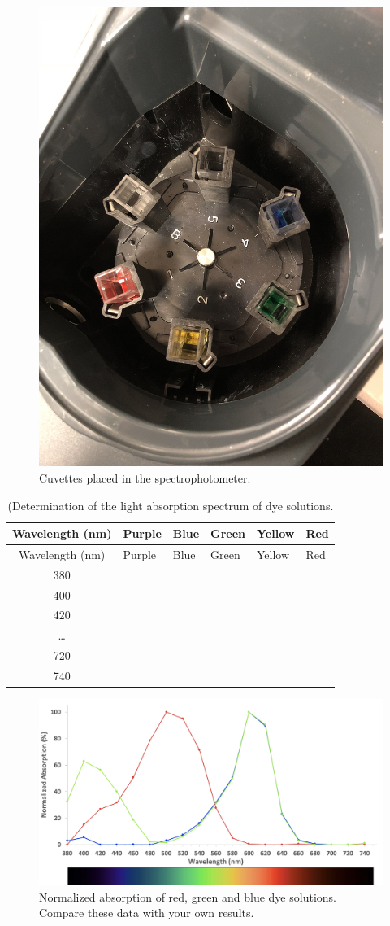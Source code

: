 \begin{figure}

{\centering \includegraphics[width=0.7\linewidth]{./figures/photosynthesis/cuvettes}

}

\caption{Cuvettes placed in the spectrophotometer.}\label{fig:cuvettes}
\end{figure}

\begin{longtable}[]{@{}clllll@{}}
\caption{(\label{tab:absorption} Determination of the light absorption
spectrum of dye solutions.}\tabularnewline
\toprule
Wavelength (nm) & Purple & Blue & Green & Yellow & Red\tabularnewline
\midrule
\endfirsthead
\toprule
Wavelength (nm) & Purple & Blue & Green & Yellow & Red\tabularnewline
\midrule
\endhead
380 & & & & &\tabularnewline
400 & & & & &\tabularnewline
420 & & & & &\tabularnewline
\ldots{} & & & & &\tabularnewline
720 & & & & &\tabularnewline
740 & & & & &\tabularnewline
\bottomrule
\end{longtable}

\begin{figure}

{\centering \includegraphics[width=0.7\linewidth]{./figures/photosynthesis/absorption_result}

}

\caption{Normalized absorption of red, green and blue dye solutions. Compare these data with your own results.}\label{fig:absorption}
\end{figure}

